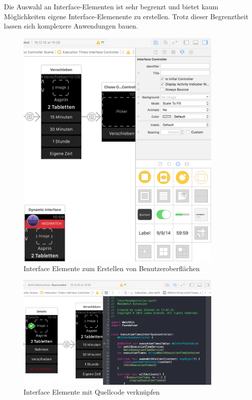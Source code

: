 Die Auswahl an Interface-Elementen ist sehr begrenzt und bietet kaum Möglichkeiten eigene Interface-Elemenente zu erstellen. Trotz dieser Begrenztheit lassen sich komplexere Anwendungen bauen.
\begin{figure}
	\caption{Interface Elemente zum Erstellen von Benutzeroberflächen}
	\label{fig:xcode-interface-elements}
	\centering
		\includegraphics[width=0.9\textwidth]{04_realisation/screenshots/xcode-interface-elements}
\end{figure}

\begin{figure}
	\caption{Interface Elemente mit Quellcode verknüpfen}
	\label{fig:xcode-interface-code-connect}
	\centering
	\includegraphics[width=0.9\textwidth]{04_realisation/screenshots/xcode-interface-code-connect}
\end{figure}

